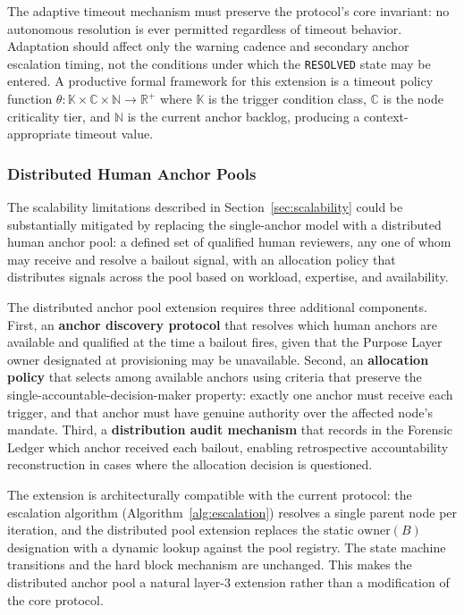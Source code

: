 The adaptive timeout mechanism must preserve the protocol's core invariant: no autonomous resolution is ever permitted regardless of timeout behavior. Adaptation should affect only the warning cadence and secondary anchor escalation timing, not the conditions under which the \texttt{RESOLVED} state may be entered. A productive formal framework for this extension is a timeout policy function $\theta : \mathbb{K} \times \mathbb{C} \times \mathbb{N} \rightarrow \mathbb{R}^+$ where $\mathbb{K}$ is the trigger condition class, $\mathbb{C}$ is the node criticality tier, and $\mathbb{N}$ is the current anchor backlog, producing a context-appropriate timeout value.

\subsubsection{Distributed Human Anchor Pools}\label{sec:anchor-pools}

The scalability limitations described in Section~\ref{sec:scalability} could be substantially mitigated by replacing the single-anchor model with a distributed human anchor pool: a defined set of qualified human reviewers, any one of whom may receive and resolve a bailout signal, with an allocation policy that distributes signals across the pool based on workload, expertise, and availability.

The distributed anchor pool extension requires three additional components. First, an \textbf{anchor discovery protocol} that resolves which human anchors are available and qualified at the time a bailout fires, given that the Purpose Layer owner designated at provisioning may be unavailable. Second, an \textbf{allocation policy} that selects among available anchors using criteria that preserve the single-accountable-decision-maker property: exactly one anchor must receive each trigger, and that anchor must have genuine authority over the affected node's mandate. Third, a \textbf{distribution audit mechanism} that records in the Forensic Ledger which anchor received each bailout, enabling retrospective accountability reconstruction in cases where the allocation decision is questioned.

The extension is architecturally compatible with the current protocol: the escalation algorithm (Algorithm~\ref{alg:escalation}) resolves a single parent node per iteration, and the distributed pool extension replaces the static $\text{owner}(B)$ designation with a dynamic lookup against the pool registry. The state machine transitions and the hard block mechanism are unchanged. This makes the distributed anchor pool a natural layer-3 extension rather than a modification of the core protocol.


